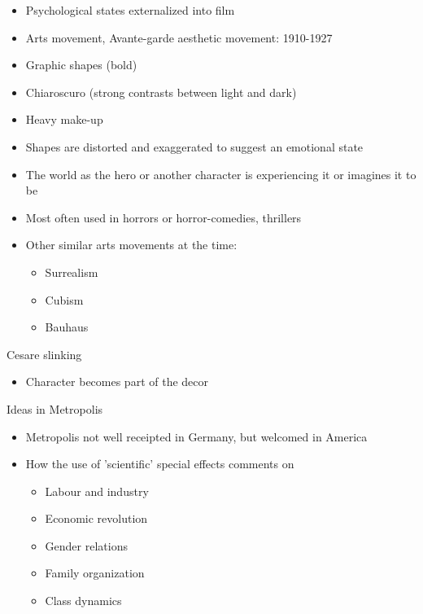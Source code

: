 \documentclass[11pt,fleqn]{book}
\begin{document}
\begin{descriptions}
\begin{itemize}
        \item Psychological states externalized into film
        \item Arts movement, Avante-garde aesthetic movement: 1910-1927
        \item Graphic shapes (bold)
        \item Chiaroscuro (strong contrasts between light and dark)
        \item Heavy make-up
        \item Shapes are distorted and exaggerated to suggest an emotional state
        \item The world as the hero or another character is experiencing it or imagines it to be
        \item Most often used in horrors or horror-comedies, thrillers
        \item Other similar arts movements at the time:
        \begin{itemize}
            \item Surrealism
            \item Cubism
            \item Bauhaus
        \end{itemize}
    \end{itemize}
    \item[Cesare slinking] 
    \begin{descriptions}
    \end{descriptions}
    \begin{itemize}
        \item Character becomes part of the decor
    \end{itemize}
    \item[Ideas in Metropolis]
    \begin{descriptions}
    \end{descriptions}
    \begin{itemize}
        \item Metropolis not well receipted in Germany, but welcomed in America
        \item How the use of 'scientific' special effects comments on
        \begin{itemize}
            \item Labour and industry
            \item Economic revolution
            \item Gender relations
            \item Family organization
            \item Class dynamics

\end{itemize}
\end{itemize}
\end{descriptions}
\end{document}
